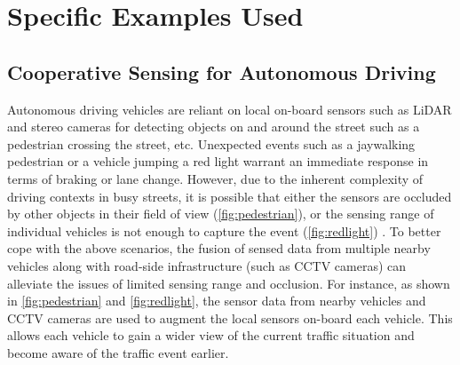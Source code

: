 \section{Specific Examples Used}
\subsection{Cooperative Sensing for Autonomous Driving}
Autonomous driving vehicles are reliant on local on-board sensors such as LiDAR and stereo cameras for detecting objects on and around the street such as a pedestrian crossing the street, etc. Unexpected events such as a jaywalking pedestrian or a vehicle jumping a red light warrant an immediate response in terms of braking or lane change. However, due to the inherent complexity of driving contexts in busy streets, it is possible that either the sensors are occluded by other objects in their field of view (\cref{fig:pedestrian}), or the sensing range of individual vehicles is not enough to capture the event (\cref{fig:redlight}) \cite{fusioneye}. To better cope with the above scenarios, the fusion of sensed data from multiple nearby vehicles along with road-side infrastructure (such as CCTV cameras) can alleviate the issues of limited sensing range and occlusion. For instance, as shown in \cref{fig:pedestrian} and \cref{fig:redlight}, the sensor data from nearby vehicles and CCTV cameras are used to augment the local sensors on-board each vehicle. This allows each vehicle to gain a wider view of the current traffic situation and become aware of the traffic event earlier.
